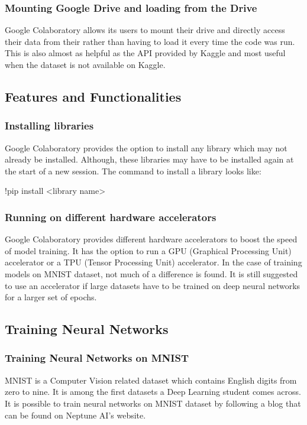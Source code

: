 \documentclass[conference,compsoc]{IEEEtran}
\begin{document}
\subsubsection{Mounting Google Drive and loading from the Drive}
Google Colaboratory allows its users to mount their drive and directly access their data from their rather than having to load it every time the code was run. This is also almost as helpful as the API provided by Kaggle and most useful when the dataset is not available on Kaggle.

\subsection{Features and Functionalities}

\subsubsection{Installing libraries}
Google Colaboratory provides the option to install any library which may not already be installed. Although, these libraries may have to be installed again at the start of a new session. The command to install a library looks like:
\begin{center}
    !pip install <library name>
\end{center}

\subsubsection{Running on different hardware accelerators}
Google Colaboratory provides different hardware accelerators to boost the speed of model training. It has the option to run a GPU (Graphical Processing Unit) accelerator or a TPU (Tensor Processing Unit) accelerator. In the case of training models on MNIST dataset, not much of a difference is found. It is still suggested to use an accelerator if large datasets have to be trained on deep neural networks for a larger set of epochs.

\subsection{Training Neural Networks}
\subsubsection{Training Neural Networks on MNIST}
MNIST is a Computer Vision related dataset which contains English digits from zero to nine. It is among the first datasets a Deep Learning student comes across. It is possible to train neural networks on MNIST dataset by following a blog that can be found on Neptune AI's website.
\end{document}
